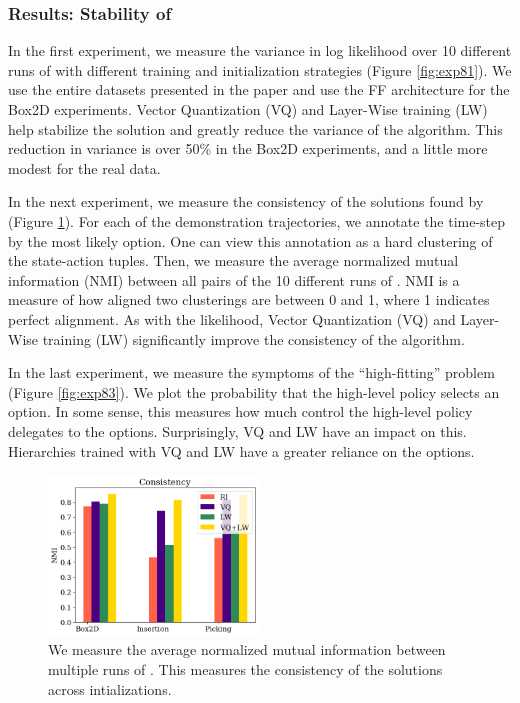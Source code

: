 \subsubsection{Results: Stability of \alg}
In the first experiment, we measure the variance in log likelihood over 10 different runs of \alg with different training and initialization strategies (Figure \ref{fig:exp81}). 
We use the entire datasets presented in the paper and use the FF architecture for the Box2D experiments.
Vector Quantization (VQ) and Layer-Wise training (LW) help stabilize the solution and greatly reduce the variance of the algorithm.
This reduction in variance is over 50\% in the Box2D experiments, and a little more modest for the real data.

In the next experiment, we measure the consistency of the solutions found by \alg (Figure \ref{fig:exp82}).
For each of the demonstration trajectories, we annotate the time-step by the most likely option.
One can view this annotation as a hard clustering of the state-action tuples.
Then, we measure the average normalized mutual information (NMI) between all pairs of the 10 different runs of \alg.
NMI is a measure of how aligned two clusterings are between 0 and 1, where 1 indicates perfect alignment.
As with the likelihood, Vector Quantization (VQ) and Layer-Wise training (LW) significantly improve the consistency of the algorithm.


In the last experiment, we measure the symptoms of the ``high-fitting'' problem (Figure \ref{fig:exp83}).
We plot the probability that the high-level policy selects an option.
In some sense, this measures how much control the high-level policy delegates to the options.
Surprisingly, VQ and LW have an impact on this.
Hierarchies trained with VQ and LW have a greater reliance on the options.

\begin{figure} [t]
\centering
    \includegraphics[width=0.5\textwidth]{ddco-experiments/exp8-2.png}
    \caption{We measure the average normalized mutual information between multiple runs of \alg. This measures the consistency of the solutions across intializations. \label{fig:exp82}}
\end{figure}


